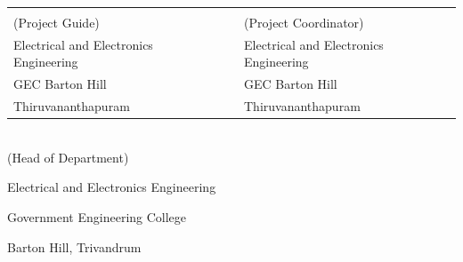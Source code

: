 \begin{singlespace}
	\vspace*{0.2cm}
	\begin{table}[h!]
		\centering
		\begin{tabular}{p{7cm} p{0.9cm} p{7cm}} 
			\textbf{\Supervisor} && \textbf{\Supervisorb} \\
			(Project Guide) &&  (Project Coordinator)\\
			Electrical and Electronics Engineering && Electrical and Electronics Engineering\\ 
			GEC Barton Hill && GEC Barton Hill\\
			Thiruvananthapuram && Thiruvananthapuram\\
		\end{tabular}
		
	\end{table}
	
	\vspace*{1cm}
	
	\begin{center}
		\centering
		
		\textbf{\Supervisora} \\ 
		(Head of Department)
		
		Electrical and Electronics Engineering
		
		Government Engineering College
		
		Barton Hill, Trivandrum
		
	\end{center}
\end{singlespace}


\thispagestyle{empty}